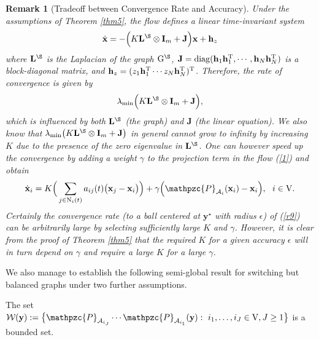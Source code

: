 \documentclass[a4paper, 11pt]{article}
\def\T{^{\rm\tiny T}}
\newtheorem{remark}{Remark}
\begin{document}
\begin{remark}[Tradeoff between Convergence Rate and Accuracy]
Under the assumptions of Theorem \ref{thm5}, the flow defines a  linear time-invariant system
\begin{align}
\dot{\mathbf{x}}=-\Big(K \mathbf{L}^\S\otimes \mathbf{I}_m +\mathbf{J}\Big)\mathbf{x}+{\mathbf{h}_z}
\end{align}
where $\mathbf{L}^\S$ is the Laplacian of the graph $\mathrm{G}^\S$,  $\mathbf{J}={\rm diag} (\mathbf{h}_1\mathbf{h}\T_1, \cdots, \mathbf{h}_N\mathbf{h}\T_N)$ is a block-diagonal matrix, and $\mathbf{h}_z=(z_1\mathbf{h}_1\T \cdots z_N \mathbf{h}_N\T)\T$. Therefore, the rate of convergence is given by
 $$
 \lambda_{\rm min}\Big(K \mathbf{L}^\S\otimes \mathbf{I}_m +\mathbf{J}\Big),
   $$
   which is influenced by both $\mathbf{L}^\S$ (the graph) and $\mathbf{J}$ (the linear equation). We also know that  $\lambda_{\rm min}\big(K \mathbf{L}^\S\otimes \mathbf{I}_m +\mathbf{J}\big)$ in general cannot grow to infinity by increasing $K$ due to the presence of the zero eigenvalue in $\mathbf{L}^\S$. One can however speed up the convergence by adding a weight $\gamma$ to the projection term in the flow (\ref{1}) and obtain
   \begin{align}\label{r9}
 \dot{\mathbf{x}}_i =K\Big( \sum_{j\in \mathrm{N}_i(t)}a_{ij}(t)\big(\mathbf{x}_j-\mathbf{x}_i\big) \Big)+ \gamma\Big( \mathpzc{P}_{\mathcal{A}_i}(\mathbf{x}_i)-\mathbf{x}_i\Big),\ \  i\in\mathrm{V}.
\end{align}
  Certainly the convergence rate (to a ball centered at $\mathbf{y}^\star$ with radius $\epsilon$) of (\ref{r9}) can be arbitrarily large  by selecting sufficiently large $K$ and $\gamma$. However, it is clear from the proof of Theorem \ref{thm5} that the required $K$ for a given accuracy $\epsilon$  will in turn depend on $\gamma$ and require a large $K$ for a large $\gamma$.







 \end{remark}




  We also manage to establish the following semi-global result for  switching but balanced graphs under two further assumptions.

\medskip

\noindent {\bf [A1]} The set $\mathcal{W}(\mathbf{y}):= \big\{\mathpzc{P}_{\mathcal{A}_{i_J}}\cdots \mathpzc{P}_{\mathcal{A}_{i_1}} (\mathbf{y}):\ i_1,\dots,i_J\in\mathrm{V}, J\geq 1\big\}$ is a bounded set.
\end{document}
